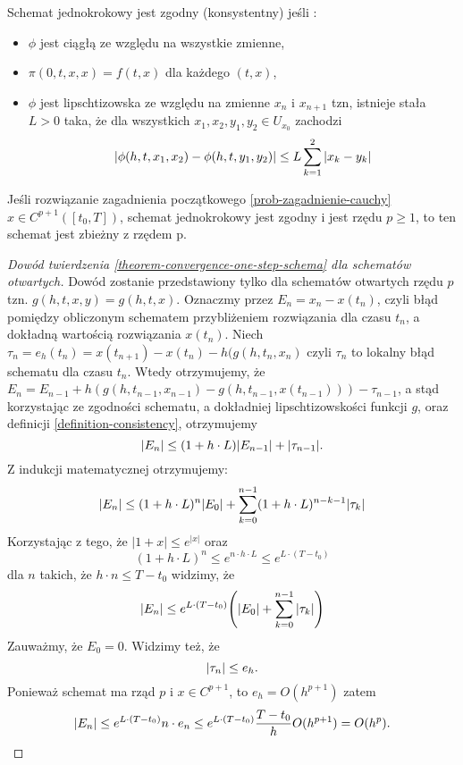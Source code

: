 \documentclass[12pt,a4paper]{report}
\begin{document}
\begin{example} 
\begin{definition}\label{definition-consistency}

Schemat jednokrokowy jest zgodny (konsystentny) jeśli :
\begin{itemize}
\item $\phi$ jest ciągłą ze względu na wszystkie zmienne,
\item $\pi(0,t,x,x) = f(t,x)$ dla każdego $(t,x)$,
\item $\phi$ jest lipschtizowska ze względu na zmienne $x_n$ i $x_{n+1}$ tzn, istnieje stała $L>0$ taka, że dla wszystkich $x_1,x_2,y_1,y_2 \in U_{x_0}$ zachodzi
$$
\abs{\phi(h,t,x_1,x_2) - \phi(h,t,y_1,y_2)} \leq L  \sum_{k=1}^{2} \abs{x_k - y_k}
$$
\end{itemize}

\end{definition}

\begin{theorem} \label{theorem-convergence-one-step-schema} 
Jeśli rozwiązanie zagadnienia początkowego \ref{prob-zagadnienie-cauchy} $x \in C^{p+1}([t_0,T])$, schemat jednokrokowy jest zgodny i jest rzędu $p\geqslant1$, to ten schemat jest zbieżny z rzędem p. 

\end{theorem}
\begin{proof}[Dowód twierdzenia \ref{theorem-convergence-one-step-schema} dla schematów otwartych]

Dowód zostanie przedstawiony tylko dla schematów otwartych rzędu $p$  tzn. $g(h,t,x,y) = g(h,t,x)$. 
Oznaczmy przez $E_n = x_n - x(t_n)$, czyli błąd pomiędzy obliczonym schematem przybliżeniem rozwiązania dla czasu $t_n$, a dokładną wartością rozwiązania $x(t_n)$. Niech $\tau_n = e_h(t_n) = x(t_{n+1}) - x(t_n) - h(g(h,t_n,x_n) $ czyli $\tau_n$ to lokalny błąd schematu dla czasu $t_n$. Wtedy otrzymujemy, że 
$E_n = E_{n-1} + h(g(h,t_{n-1},x_{n-1}) - g(h,t_{n-1},x(t_{n-1}))) - \tau_{n-1} $,
a stąd korzystając ze zgodności schematu, a dokładniej lipschtizowskości funkcji $g$, oraz definicji \ref{definition-consistency}, otrzymujemy
$$
{\left| {E_n} \right|} \leq (1 + h \cdot L) {\left| {E_{n-1}} \right|} + {\left| {\tau_{n-1}} \right|} .
$$
Z indukcji matematycznej otrzymujemy:
$$
\abs{E_n} \leq (1 + h \cdot L)^{n} \abs{E_0} + \sum_{k=0}^{n-1} (1+ h \cdot L)^{n-k-1} \abs{\tau_k} 
$$
Korzystając z tego, że $|1+x|\leqslant e^{|x|}$ oraz 
$$
(1 + h \cdot L)^{n} \leq e^{n \cdot h \cdot L} \leq e^{L \cdot (T-t_0)} 
$$
dla $n$ takich, że $h\cdot n\leq  T - t_0 $ widzimy, że
$$
\abs{E_n} \leq e^{L \cdot (T-t_0)} \bracket{\abs{E_0} + \sum_{k=0}^{n-1}\abs{\tau_k}}
$$
Zauważmy, że $E_0 = 0$. Widzimy też, że 
$$
{\left| {\tau_n} \right|} \leq e_h.
$$
Ponieważ schemat ma rząd $p$ i $x \in C^{p+1}$, to $ e_h = O(h^{p+1}) $ zatem 
$$ 
{\left| {E_n} \right|} \leq e^{L\cdot(T-t_0)} n \cdot e_n \leq e^{L \cdot (T-t_0)} \frac{T-t_0}{h}O(h^{p+1}) = O(h^p).
$$ 


\end{proof}
\end{example}
\end{document}
